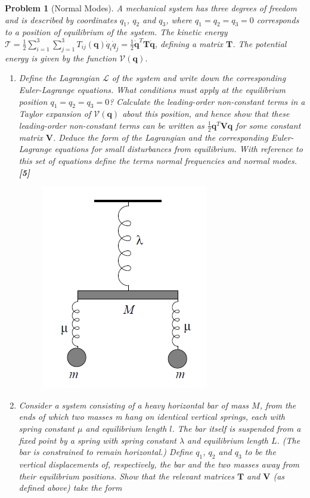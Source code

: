 \documentclass[a4paper]{article}
\theoremstyle{new}
\newtheorem{qns}{Problem}[section]
\begin{document}
\begin{qns}[Normal Modes]
A mechanical system has three degrees of freedom and is described by coordinates $q_1$, $q_2$ and $q_3$, where $q_1 = q_2 = q_3 = 0$ corresponds to a position of equilibrium of the system. The kinetic energy $\mathcal{T}=\frac{1}{2}\sum_{i=1}^3\sum_{j=1}^3T_{ij}(\mathbf{q})\dot{q}_i\dot{q}_j=\frac{1}{2}\mathbf{\dot{q}}^T\mathbf{T}\mathbf{\dot{q}}$, defining a matrix $\mathbf{T}$. The potential energy is given by the function $\mathcal{V}(\mathbf{q})$.
\begin{enumerate}[label=(\roman*)]
\item Define the Lagrangian $\mathcal{L}$ of the system and write down the corresponding Euler-Lagrange equations. What conditions must apply at the equilibrium position $q_1=q_2=q_3=0$? Calculate the leading-order non-constant terms in a Taylor expansion of $\mathcal{V}(\mathbf{q})$ about this position, and hence show that these leading-order non-constant terms can be written as $\frac{1}{2}\mathbf{q}^T\mathbf{V}\mathbf{q}$ for some constant matrix $\mathbf{V}$. Deduce the form of the Lagrangian and the corresponding Euler-Lagrange equations for small disturbances from equilibrium. With reference to this set of equations define the terms normal frequencies and normal modes.\hfill\textbf{[5]}
\begin{figure}[H]
    \centering
    \includegraphics[scale=0.8]{2011P2Q7.PNG}
\end{figure}
\item Consider a system consisting of a heavy horizontal bar of mass $M$, from the ends of which two masses m hang on identical vertical springs, each with spring constant $\mu$ and equilibrium length $l$. The bar itself is suspended from a fixed point by a spring with spring constant $\lambda$ and equilibrium length $L$. (The bar is constrained to remain horizontal.) Define $q_1$, $q_2$ and $q_3$ to be the vertical displacements of, respectively, the bar and the two masses away from their equilibrium positions. Show that the relevant matrices $\mathbf{T}$ and $\mathbf{V}$ (as defined above) take the form

\end{enumerate}
\end{qns}
\end{document}
